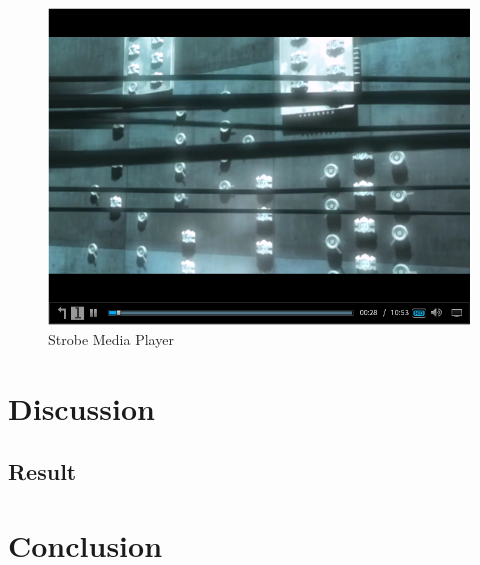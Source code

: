 \documentclass[9pt,a4paper]{acmproc}
\begin{document}
\begin{figure}[!ht]
\begin{center}
\includegraphics[scale=0.5]{Media_player.png}
\caption{Strobe Media Player}
\end{center}
\end{figure}

\clearpage

\section{Discussion}

\subsection{Result}

\section{Conclusion}
\end{document}
